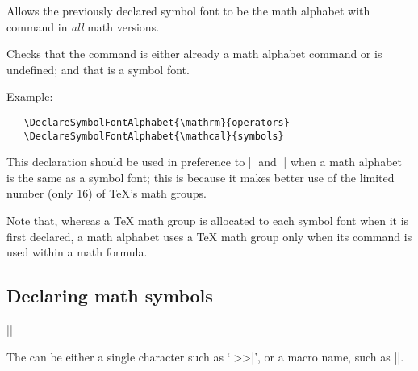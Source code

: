 \documentclass{ltxguide}[1995/11/28]
\begin{document}
Allows the previously declared symbol font  to be the
math alphabet with command  in \emph{all} math versions.
 
Checks that the command  is either already a math alphabet
command or is undefined; and that  is a symbol font.
 

Example:
\begin{verbatim}
   \DeclareSymbolFontAlphabet{\mathrm}{operators}
   \DeclareSymbolFontAlphabet{\mathcal}{symbols}
\end{verbatim}
 
This declaration should be used in preference to
|\DeclareMathAlphabet| and |\SetMathAlphabet| when a math alphabet is
the same as a symbol font; this is because it makes better use of the
limited number (only 16) of \TeX's math groups.
 
Note that, whereas a \TeX{} math group is allocated to each symbol font
when it is first declared, a math alphabet uses a \TeX{} math group
only when its command is used within a math formula.


\subsection{Declaring math symbols}
\label{Sec:math.commands}
 
\begin{decl}
|\DeclareMathSymbol|   
\end{decl}
 
The  can be either a single character such as `|>>|', or a
macro name, such as |\sum|.
 
\end{document}
